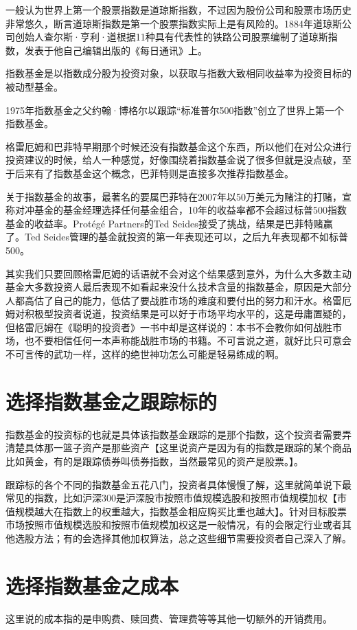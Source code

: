 \documentclass[12pt,oneside]{book}
\begin{document}
一般认为世界上第一个股票指数是道琼斯指数，不过因为股份公司和股票市场历史非常悠久，断言道琼斯指数是第一个股票指数实际上是有风险的。1884年道琼斯公司创始人查尔斯·亨利·道根据11种具有代表性的铁路公司股票编制了道琼斯指数，发表于他自己编辑出版的《每日通讯》上。

指数基金是以指数成分股为投资对象，以获取与指数大致相同收益率为投资目标的被动型基金。

1975年指数基金之父约翰·博格尔以跟踪“标准普尔500指数”创立了世界上第一个指数基金。

格雷厄姆和巴菲特早期那个时候还没有指数基金这个东西，所以他们在对公众进行投资建议的时候，给人一种感觉，好像围绕着指数基金说了很多但就是没点破，至于后来有了指数基金这个概念，巴菲特则是直接多次推荐指数基金。

关于指数基金的故事，最著名的要属巴菲特在2007年以50万美元为赌注的打赌，宣称对冲基金的基金经理选择任何基金组合，10年的收益率都不会超过标普500指数基金的收益率。Protégé Partners的Ted Seides接受了挑战，结果是巴菲特赌赢了。Ted Seides管理的基金就投资的第一年表现还可以，之后九年表现都不如标普500。

其实我们只要回顾格雷厄姆的话语就不会对这个结果感到意外，为什么大多数主动基金大多数投资人最后表现不如看起来没什么技术含量的指数基金，原因是大部分人都高估了自己的能力，低估了要战胜市场的难度和要付出的努力和汗水。格雷厄姆对积极型投资者说道，投资结果是可以好于市场平均水平的，这是毋庸置疑的，但格雷厄姆在《聪明的投资者》一书中却是这样说的：本书不会教你如何战胜市场，也不要相信任何一本声称能战胜市场的书籍。不可言说之道，就好比只可意会不可言传的武功一样，这样的绝世神功怎么可能是轻易练成的啊。


\section{选择指数基金之跟踪标的}
指数基金的投资标的也就是具体该指数基金跟踪的是那个指数，这个投资者需要弄清楚具体那一篮子资产是那些资产【这里说资产是因为有的指数是跟踪的某个商品比如黄金，有的是跟踪债券叫债券指数，当然最常见的资产是股票。】。

跟踪标的各个不同的指数基金五花八门，投资者具体慢慢了解，这里就简单说下最常见的指数，比如沪深300是沪深股市按照市值规模选股和按照市值规模加权【市值规模越大在指数上的权重越大，指数基金相应购买比重也越大】。针对目标股票市场按照市值规模选股和按照市值规模加权这是一般情况，有的会限定行业或者其他选股方法；有的会选择其他加权算法，总之这些细节需要投资者自己深入了解。




\section{选择指数基金之成本}
这里说的成本指的是申购费、赎回费、管理费等等其他一切额外的开销费用。
\end{document}
